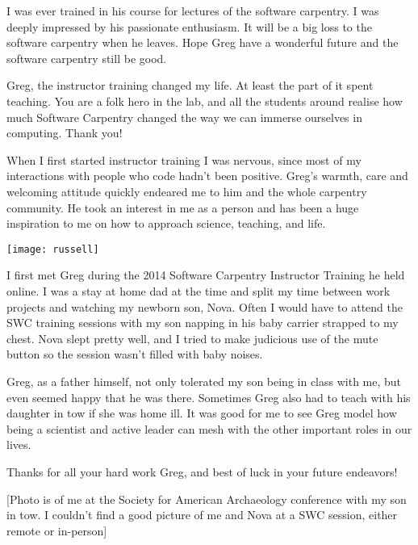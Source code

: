 
\newpage

I was ever trained in his course for lectures of the software carpentry. I was
deeply impressed by his passionate enthusiasm. It will be a big loss to the
software carpentry when he leaves. Hope Greg have a wonderful future and the
software carpentry still be good.


\newpage

\newpage

Greg, the instructor training changed my life. At least the part of it spent
teaching. You are a folk hero in the lab, and all the students around realise
how much Software Carpentry changed the way we can immerse ourselves in
computing. Thank you!


\newpage

When I first started instructor training I was nervous, since most of my
interactions with people who code hadn't been positive. Greg's warmth, care and
welcoming attitude quickly endeared me to him and the whole carpentry
community. He took an interest in me as a person and has been a huge
inspiration to me on how to approach science, teaching, and life. 


\newpage
\pagestyle{plain}
\begin{minipage}{0.45\textwidth}
    \texttt{[image: russell]}
\end{minipage}
\hfill
\begin{minipage}{0.45\textwidth}
\setlength{\parindent}{0in}
\setlength{\parskip}{1em}
I first met Greg during the 2014 Software Carpentry Instructor Training he held
online. I was a stay at home dad at the time and split my time between work
projects and watching my newborn son, Nova. Often I would have to attend
the SWC training sessions with my son napping in his baby carrier strapped
to my chest. Nova slept pretty well, and I tried to make judicious use of
the mute button so the session wasn't filled with baby noises. 

Greg, as a father himself, not only tolerated my son being in class with
me, but even seemed happy that he was there. Sometimes Greg also had to
teach with his daughter in tow if she was home ill. It was good for me to
see Greg model how being a scientist and active leader can mesh with the
other important roles in our lives. 

Thanks for all your hard work Greg, and best of luck in your future endeavors! 

[Photo is of me at the Society for American Archaeology conference with my son
in tow. I couldn't find a good picture of me and Nova at a SWC session, either
remote or in-person]

\end{minipage}

